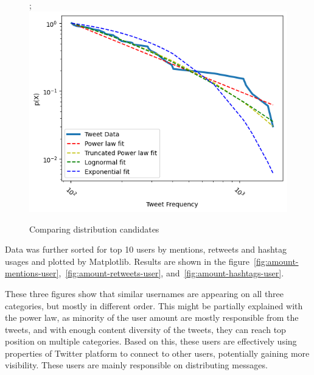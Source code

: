 \documentclass[conference]{IEEEtran}
\begin{document}
\begin{figure};
\includegraphics[scale=0.5]{figures/amount_tweets_powerlaw}
\caption{Comparing distribution candidates}
\label{fig:amount-tweets-powerlaw}
\end{figure}

Data was further sorted for top 10 users by mentions, retweets and hashtag usages and plotted by Matplotlib.
Results are shown in the figure~\ref{fig:amount-mentions-user},~\ref{fig:amount-retweets-user}, and~\ref{fig:amount-hashtags-user}.

These three figures show that similar usernames are appearing on all three categories, but mostly in different order.
This might be partially explained with the power law, as minority of the user amount are mostly responsible from the tweets,
and with enough content diversity of the tweets, they can reach top position on multiple categories.
Based on this, these users are effectively using properties of Twitter platform to connect to other users, potentially gaining more visibility.
These users are mainly responsible on distributing messages.
\end{document}
